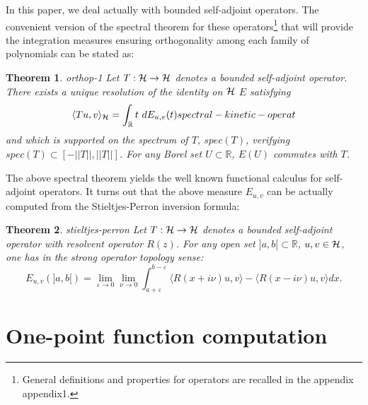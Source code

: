 \documentclass[10pt]{book}
\theoremstyle{break}
\newtheorem{theorem}{Theorem}
\begin{document}
In this paper, we deal actually with bounded self-adjoint operators. The convenient version of the spectral theorem for these operators{\footnote{General definitions and properties for operators are recalled in the appendix {appendix1}.}} that will provide the integration measures ensuring orthogonality among each family of polynomials can be stated as:
\begin{theorem}{orthop-1}
Let $T:{\cal{H}}\to{\cal{H}}$ denotes a bounded self-adjoint operator. There exists a unique resolution of the identity on ${\cal{H}} $ $E$ satisfying 
\begin{equation}
\langle Tu,v \rangle_{\cal{H}}=\int_{\mathbb{R}}t\ dE_{u,v}(t){spectral-kinetic-operat}
\end{equation}
and which is supported on the spectrum of $T$, $spec(T)$, verifying $spec(T)\subset[-||T|| ,||T||]$. For any Borel set $U\subset\mathbb{R}$, $E(U)$ commutes with $T$.
\end{theorem}
The above spectral theorem yields the well known functional calculus for self-adjoint operators. It turns out that the above measure $E_{u,v}$ can be actually computed from the Stieltjes-Perron inversion formula:
\begin{theorem}{stieltjes-perron}
Let $T:{\cal{H}}\to{\cal{H}}$ denotes a bounded self-adjoint operator with resolvent operator $R(z)$. For any open set $]a,b[\subset\mathbb{R}$, $u,v\in\cal{H}$, one has in the strong operator topology sense:
\begin{equation}
E_{u,v}(]a,b[)=\lim_{\varepsilon\to0}\lim_{\nu\to0 }\int_{a+\varepsilon}^{b-\varepsilon}\langle R(x+i\nu)u,v \rangle-\langle R(x-i\nu)u,v \rangle dx.
\end{equation}
\end{theorem}



\section{One-point function computation}
\end{document}
